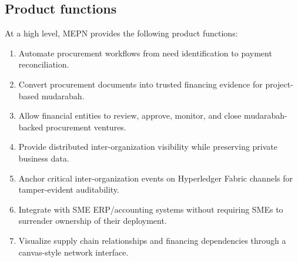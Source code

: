\documentclass[11pt,a4paper]{article}
\newcommand{\systemshort}{MEPN}
\begin{document}
\subsection{Product functions}
At a high level, \systemshort{} provides the following product functions:
\begin{enumerate}
  \item Automate procurement workflows from need identification to payment reconciliation.
  \item Convert procurement documents into trusted financing evidence for project-based mudarabah.
  \item Allow financial entities to review, approve, monitor, and close mudarabah-backed procurement ventures.
  \item Provide distributed inter-organization visibility while preserving private business data.
  \item Anchor critical inter-organization events on Hyperledger Fabric channels for tamper-evident auditability.
  \item Integrate with SME ERP/accounting systems without requiring SMEs to surrender ownership of their deployment.
  \item Visualize supply chain relationships and financing dependencies through a canvas-style network interface.
\end{enumerate}
\end{document}
